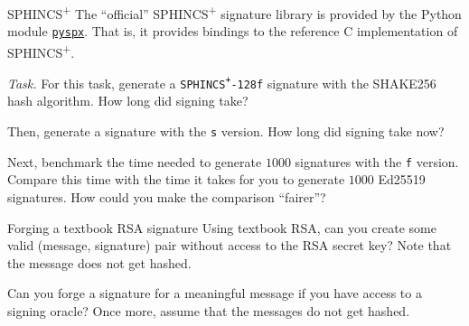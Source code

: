 \documentclass{practice}
\begin{document}
\begin{task}{SPHINCS\textsuperscript{+}}
  The \enquote{official} SPHINCS\textsuperscript{+} signature library is provided by the Python module \href{https://github.com/sphincs/pyspx}{\texttt{pyspx}}.
  That is, it provides bindings to the reference C implementation of SPHINCS\textsuperscript{+}.

  \textit{Task.}
  For this task, generate a \texttt{SPHINCS\textsuperscript{+}-128f} signature with the SHAKE256 hash algorithm.
  How long did signing take?

  Then, generate a signature with the \texttt{s} version.
  How long did signing take now?

  Next, benchmark the time needed to generate $1000$ signatures with the \texttt{f} version.
  Compare this time with the time it takes for you to generate $1000$ Ed25519 signatures.
  How could you make the comparison \enquote{fairer}?
\end{task}

\begin{task}{Forging a textbook RSA signature}
  Using textbook RSA, can you create some valid (message, signature) pair without access to the RSA secret key?
  Note that the message does not get hashed.

  Can you forge a signature for a meaningful message if you have access to a signing oracle?
  Once more, assume that the messages do not get hashed.
\end{task}

\iffalse
\begin{task}{EdDSA with OpenSSL}
  \textit{Preface.}
  At this point, you should have some familiarity with OpenSSL.
  The \href{https://www.openssl.org/docs/man3.0/man1/openssl-dgst.html}{\texttt{dgst}} tool is typically used for signing (with pre-hashing) and for verifying signatures.
  However, the \texttt{dgst} tool does not support EdDSA signing.
  Instead, you should use the \href{https://www.openssl.org/docs/man3.0/man1/openssl-pkeyutl.html}{\texttt{pkeyutl}} tool.

  \textit{Task.}
  For this task, familiarise yourself with the OpenSSL documentation.
  Then, generate an Ed25519 keypair with OpenSSL and try to sign and verify a signature from the command line.

  Verify the signature with some other tool (e.g. in Python).
  Did OpenSSL use PureEdDSA?

  This task is cursed and will prove to you that OpenSSL (and especially its documentation) is horrible.
  This task will likely be part of the homework as well ;).
\end{task}
\fi
\end{document}
